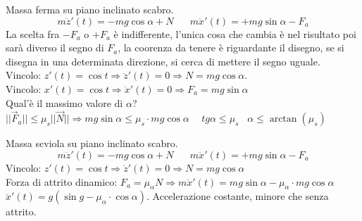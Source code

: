 \begin{example}
    Massa ferma su piano inclinato scabro.
    $$m\ddot{z}'(t) = -mg\cos\alpha + N \hspace{20pt} m\ddot{x}'(t) = +mg\sin\alpha - F_{a}$$
    La scelta fra $-F_{a}$ o $+F_a$ è indifferente, l'unica cosa che cambia è nel risultato poi sarà diverso il segno di $F_a$, la coorenza da tenere è riguardante il disegno, se si disegna
    in una determinata direzione, si cerca di mettere il segno uguale.\\
    Vincolo: $z'(t) = \cos t \Rightarrow \ddot{z}'(t) = 0 \Rightarrow N = mg\cos\alpha$.\\
    Vincolo: $x'(t) = \cos t \Rightarrow \ddot{x}'(t) = 0 \Rightarrow F_a = mg\sin\alpha$\\
    Qual'è il massimo valore di $\alpha$?\\
    $||\vec{F}_a|| \leq \mu_s ||\vec{N}|| \Rightarrow mg\sin\alpha \leq \mu_s \cdot mg \cos\alpha \hspace{15pt} tg\alpha \leq \mu_s \hspace{10pt} \alpha \leq \arctan(\mu_s)$
\end{example}

\begin{example}
    Massa scviola su piano inclinato scabro.
    $$m\ddot{z}'(t) = -mg\cos\alpha + N \hspace{20pt} m\ddot{x}'(t) = +mg\sin\alpha - F_{a}$$
    Vincolo: $z'(t) = \cos t \Rightarrow \ddot{z}'(t) = 0 \Rightarrow N = mg\cos\alpha$\\
    Forza di attrito dinamico: $F_a = \mu_{\alpha}N \Rightarrow m\ddot{x}'(t) = mg\sin\alpha - \mu_{\alpha} \cdot mg\cos\alpha$\\
    $\ddot{x}'(t) = g(\sin g - \mu_{\alpha} \cdot \cos \alpha)$. Accelerazione costante, minore che senza attrito.
\end{example}